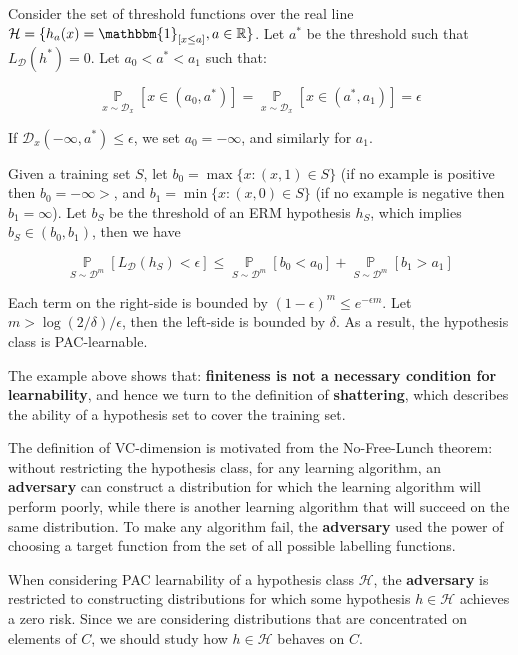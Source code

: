\documentclass{article}
\begin{document}
Consider the set of threshold functions over the real line $\mathcal{H}=\{h_a(x)=\mathbbm{1}_{[x\leq a]},a\in\mathbb{R}\}$. Let $a^*$ be the threshold such that $L_\mathcal{D}(h^*)=0$. Let $a_0<a^*<a_1$ such that:

\begin{equation*}
\mathop{\mathbb{P}}\limits_{x\sim\mathcal{D}_x}[x\in(a_0,a^*)]=\mathop{\mathbb{P}}\limits_{x\sim\mathcal{D}_x}[x\in(a^*,a_1)]=\epsilon
\end{equation*}

If $\mathcal{D}_x(-\infty,a^*)\leq\epsilon$, we set $a_0=-\infty$, and similarly for $a_1$.

Given a training set $S$, let $b_0=\max\{x:(x,1)\in S\}$ (if no example is positive then $b_0=-\infty>$, and $b_1=\min\{x:(x,0)\in S\}$ (if no example is negative then $b_1=\infty$). Let $b_S$ be the threshold of an ERM hypothesis $h_S$, which implies $b_S\in(b_0,b_1)$, then we have

\begin{equation*}
\mathop{\mathbb{P}}\limits_{S\sim\mathcal{D}^m}[L_\mathcal{D}(h_S)<\epsilon]\leq\mathop{\mathbb{P}}\limits_{S\sim\mathcal{D}^m}[b_0<a_0]+\mathop{\mathbb{P}}\limits_{S\sim\mathcal{D}^m}[b_1>a_1]
\end{equation*}

Each term on the right-side is bounded by $(1-\epsilon)^m\leq e^{-\epsilon m}$. Let $m>\log(2/\delta)/\epsilon$, then the left-side is bounded by $\delta$. As a result, the hypothesis class is PAC-learnable.

The example above shows that: \textbf{finiteness is not a necessary condition for learnability}, and hence we turn to the definition of \textbf{shattering}, which describes the ability of a hypothesis set to cover the training set.

The definition of VC-dimension is motivated from the No-Free-Lunch theorem: without restricting the hypothesis class, for any learning algorithm, an \textbf{adversary} can construct a distribution for which the learning algorithm will perform poorly, while there is another learning algorithm that will succeed on the same distribution. To make any algorithm fail, the \textbf{adversary} used the power of choosing a target function from the set of all possible labelling functions.

When considering PAC learnability of a hypothesis class $\mathcal{H}$, the \textbf{adversary} is restricted to constructing distributions for which some hypothesis $h\in\mathcal{H}$ achieves a zero risk. Since we are considering distributions that are concentrated on elements of $C$, we should study how $h\in\mathcal{H}$ behaves on $C$.
\end{document}
